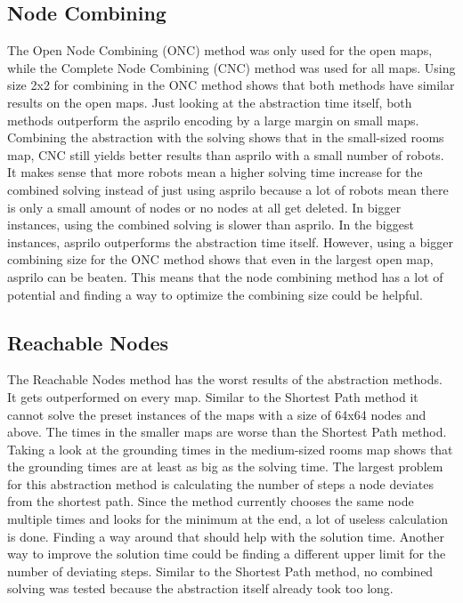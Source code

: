 \documentclass[runningheads]{llncs}
\begin{document}
\subsection{Node Combining}
The Open Node Combining (ONC) method was only used for the open maps, while the Complete Node Combining (CNC) method was used for all maps. Using size 2x2 for combining in the ONC method shows that both methods have similar results on the open maps. Just looking at the abstraction time itself, both methods outperform the asprilo encoding by a large margin on small maps. Combining the abstraction with the solving shows that in the small-sized rooms map, CNC still yields better results than asprilo with a small number of robots. It makes sense that more robots mean a higher solving time increase for the combined solving instead of just using asprilo because a lot of robots mean there is only a small amount of nodes or no nodes at all get deleted. In bigger instances, using the combined solving is slower than asprilo. In the biggest instances, asprilo outperforms the abstraction time itself. However, using a bigger combining size for the ONC method shows that even in the largest open map, asprilo can be beaten. This means that the node combining method has a lot of potential and finding a way to optimize the combining size could be helpful. 
\subsection{Reachable Nodes}
The Reachable Nodes method has the worst results of the abstraction methods. It gets outperformed on every map. Similar to the Shortest Path method it cannot solve the preset instances of the maps with a size of 64x64 nodes and above. The times in the smaller maps are worse than the Shortest Path method. Taking a look at the grounding times in the medium-sized rooms map shows that the grounding times are at least as big as the solving time. The largest problem for this abstraction method is calculating the number of steps a node deviates from the shortest path. Since the method currently chooses the same node multiple times and looks for the minimum at the end, a lot of useless calculation is done. Finding a way around that should help with the solution time. Another way to improve the solution time could be finding a different upper limit for the number of deviating steps. Similar to the Shortest Path method, no combined solving was tested because the abstraction itself already took too long.
\end{document}
